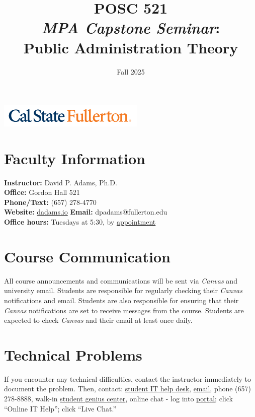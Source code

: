 \documentclass[12pt]{article}     %
\title{\textbf{\Huge{POSC 521}} \\ \textit{MPA Capstone Seminar}: \\
Public Administration Theory} %
\author{}                         %
\date{\Large{Fall 2025}}              %
\begin{document}
\maketitle
\begin{center}
    \includegraphics[width=2.75in, alt={Cal State Fullerton wordmark}]{csuf_logo.png}
\end{center}


\section{Faculty Information}
\noindent \textbf{Instructor:} David P. Adams, Ph.D. \\
\noindent \textbf{Office:} Gordon Hall 521 \\
\noindent \textbf{Phone/Text:} (657) 278-4770 \\
\noindent \textbf{Website:} \href{https://dadams.io}{dadams.io}
\noindent \textbf{Email:} dpadams@fullerton.edu \\
\noindent \textbf{Office hours:} Tuesdays at 5:30, by \href{https://dadams.io/appointments}{appointment}

\section{Course Communication}
All course announcements and communications will be sent via \emph{Canvas} and university email. Students are responsible for regularly checking their \emph{Canvas} notifications and email. Students are also responsible for ensuring that their \emph{Canvas} notifications are set to receive messages from the course. Students are expected to check \emph{Canvas} and their email at least once daily.


\section{Technical Problems}
If you encounter any technical difficulties, contact the instructor immediately to document the problem. Then, contact: \href{http://www.fullerton.edu/it/students/helpdesk/index.php}{student IT help desk}, \href{mailto:StudentITHelpDesk@fullerton.edu}{email}, phone (657) 278-8888, walk-in \href{http://www.fullerton.edu/it/students/sgc/index.php}{student genius center}, online chat - log into \href{http://my.fullerton.edu}{portal}; click ``Online IT Help''; click ``Live Chat.''
\end{document}
